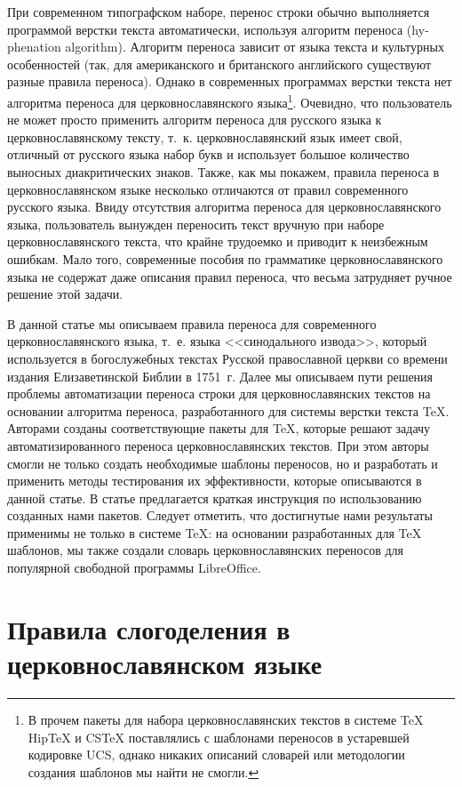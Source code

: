 \documentclass[12pt,a4paper,oneside]{extarticle}
\begin{document}
При современном типографском наборе, перенос строки обычно выполняется программой верстки текста автоматически, используя алгоритм переноса (\textenglish{hyphenation algorithm}). Алгоритм переноса зависит от языка текста и культурных особенностей (так, для американского и британского английского существуют разные правила переноса). Однако в современных программах верстки текста нет алгоритма переноса для церковнославянского языка\footnote{В прочем пакеты для набора церковнославянских текстов в системе \TeX{} HipTeX и CSTeX поставлялись с шаблонами переносов в устаревшей кодировке UCS, однако никаких описаний словарей или методологии создания шаблонов мы найти не смогли.}. Очевидно, что пользователь не может просто применить алгоритм переноса для русского языка к церковнославянскому тексту, т.~к. церковнославянский язык имеет свой, отличный от русского языка набор букв и использует большое количество выносных диакритических знаков. Также, как мы покажем, правила переноса в церковнославянском языке несколько отличаются от правил современного русского языка. Ввиду отсутствия алгоритма переноса для церковнославянского языка, пользователь вынужден переносить текст вручную при наборе церковнославянского текста, что крайне трудоемко и приводит к неизбежным ошибкам. Мало того, современные пособия по грамматике церковнославянского языка не содержат даже описания правил переноса, что весьма затрудняет ручное решение  этой задачи.

В данной статье мы описываем правила переноса для современного церковнославянского языка, т.~е. языка <<синодального извода>>, который используется в богослужебных текстах Русской православной церкви со времени издания Елизаветинской Библии в 1751~г. Далее мы описываем пути решения проблемы автоматизации переноса строки для церковнославянских текстов на основании алгоритма переноса, разработанного для системы верстки текста \TeX{}. Авторами созданы соответствующие пакеты для \TeX{}, которые решают задачу автоматизированного переноса церковнославянских текстов. При этом авторы смогли не только создать необходимые шаблоны переносов, но и разработать и применить методы тестирования их эффективности, которые описываются в данной статье. В статье предлагается краткая инструкция по использованию созданных нами пакетов. Следует отметить, что достигнутые нами результаты применимы не только в системе \TeX{}: на основании разработанных для \TeX{} шаблонов, мы также создали словарь церковнославянских переносов для популярной свободной программы LibreOffice.

\section{Правила слогоделения в церковнославянском языке}
\end{document}
